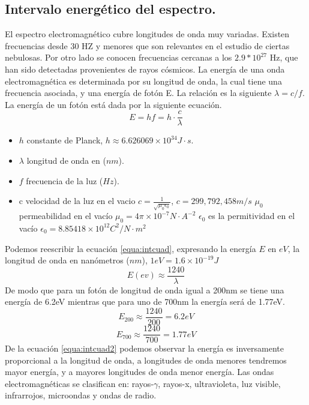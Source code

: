 \subsection{Intervalo energético del espectro.}
El espectro electromagnético cubre longitudes de onda muy variadas. Existen frecuencias desde 30 HZ y menores que son relevantes en el estudio de ciertas nebulosas. Por otro lado se conocen frecuencias cercanas a los  $2.9*10^{27}$ Hz, que han sido detectadas provenientes de rayos cósmicos.
La energía de una onda electromagnética es determinada por su longitud de onda, la cual tiene una frecuencia asociada, y una energía de fotón E. La relación es la siguiente 
$\lambda = c/f$. La energía de un fotón está dada por la siguiente ecuación.
\begin{equation}
E = hf =h\cdot \frac{c}{\lambda}
\label{equa:intcuad}
\end{equation}
\begin{itemize}
	\item $h$ constante de Planck, $h \approx 6.626069\times 10^{34} J\cdot s$.
	\item $\lambda$ longitud de onda en ($nm$).
	\item $f$ frecuencia de la luz ($Hz$).
	\item c velocidad de la luz en el vacio $c = \frac{1}{\sqrt{\mu_0\epsilon_0}}$, $c = 299,792,458 m/s$
	\subitem $\mu_0$ permeabilidad en el vacío $\mu_0 = 4\pi\times10^{-7} N\cdot A^{-2}$
	\subitem $\epsilon_0$ es la permitividad en el vacío $\epsilon_0 = 8.85418\times10^{12} C^2/N\cdot m^2$
	
\end{itemize}
Podemos reescribir la ecuación \ref{equa:intcuad}, expresando la energía $E$ en $eV$, la longitud de onda en nanómetros ($nm$), $1eV = 1.6\times 10^{-19} J$
\begin{equation}
E(ev)\approx \frac{1240}{\lambda}
\label{equa:intcuad2}
\end{equation}
De modo que para un fotón de longitud de onda igual a 200nm se tiene una energía de 6.2eV mientras que para uno de 700nm la energía será de 1.77eV.
$$E_{200}\approx \frac{1240}{200}=6.2eV $$
$$E_{700}\approx \frac{1240}{700}=1.77eV $$
De la ecuación \ref{equa:intcuad2} podemos observar la energía es inversamente proporcional a la longitud de onda, a longitudes de onda menores tendremos mayor energía, y a mayores longitudes de onda menor energía.
Las ondas electromagnéticas se clasifican en: rayos-$\gamma$, rayos-x, ultravioleta, luz visible, infrarrojos, microondas y ondas de radio.


